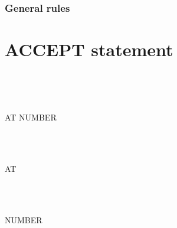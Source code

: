 \subsubsection{General rules}

\section{ACCEPT statement}

\begin{syntax}
  \begin{1=}
    \identifier \\
  \end{1=}
  \begin{0-1}
     \mnemonicname
  \end{0-1}
  \begin{0-1}
  \end{0-1}
\end{syntax}

\begin{syntax}
  \begin{1=}
    \identifier \\
  \end{1=}

  \begin{0+}
    \begin{1=}
      \begin{1+}
        AT  NUMBER
        \begin{1=}
          \identifier \\
          \integer
        \end{1=} \\

        AT
        \begin{1=}
           \\
           \\
        \end{1=}
        NUMBER
        \begin{1=}
          \identifier \\
          \integer
        \end{1=}
      \end{1+} \\

    \end{1=} \\

     \\
     \\
     \\
  \end{0+}
\end{syntax}

